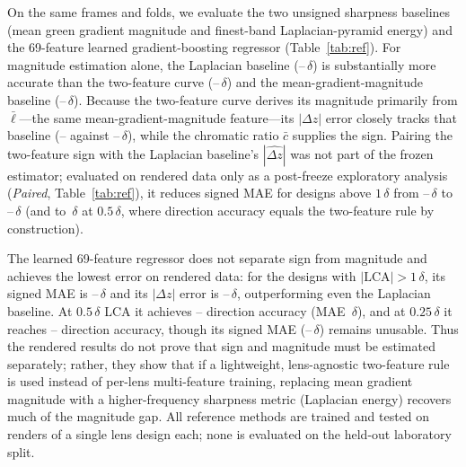 \documentclass{ieee-ojvt}
\begin{document}
On the same frames and folds, we evaluate the two unsigned sharpness baselines (mean green gradient magnitude and finest-band Laplacian-pyramid energy) and the 69-feature learned gradient-boosting regressor (Table~\ref{tab:ref}).
For magnitude estimation alone, the Laplacian baseline (\RefLapAbsMin--\RefLapAbsMax\,$\delta$) is substantially more accurate than the two-feature curve (\RefPhysAbsMin--\RefPhysAbsMax\,$\delta$) and the mean-gradient-magnitude baseline (\RefTenAbsMin--\RefTenAbsMax\,$\delta$).
Because the two-feature curve derives its magnitude primarily from $\bar\ell$---the same mean-gradient-magnitude feature---its $|\Delta z|$ error closely tracks that baseline (\RefPhysAbsMin--\RefPhysAbsMax{} against \RefTenAbsMin--\RefTenAbsMax\,$\delta$), while the chromatic ratio $\bar c$ supplies the sign. Pairing the two-feature sign with the Laplacian baseline's $|\widehat{\Delta z}|$ was not part of the frozen estimator; evaluated on rendered data only as a post-freeze exploratory analysis (\emph{Paired}, Table~\ref{tab:ref}), it reduces signed MAE for designs above $1\,\delta$ from \RefPhysMaeMin--\RefPhysMaeMax\,$\delta$ to \RefPairedMaeMin--\RefPairedMaeMax\,$\delta$ (and to \RefHalfPairedMae\,$\delta$ at $0.5\,\delta$, where direction accuracy equals the two-feature rule by construction).

The learned 69-feature regressor does not separate sign from magnitude and achieves the lowest error on rendered data: for the \RefGateBN{} designs with $|\mathrm{LCA}|>1\,\delta$, its signed MAE is \RefLearnMaeMin--\RefLearnMaeMax\,$\delta$ and its $|\Delta z|$ error is \RefLearnAbsMin--\RefLearnAbsMax\,$\delta$, outperforming even the Laplacian baseline. At $0.5\,\delta$ LCA it achieves \RefHalfLearnDirMin--\RefHalfLearnDirMax{} direction accuracy (MAE \RefHalfLearnMae\,$\delta$), and at $0.25\,\delta$ it reaches \RefQuarterLearnDirMin--\RefQuarterLearnDirMax{} direction accuracy, though its signed MAE (\RefQuarterLearnMaeMin--\RefQuarterLearnMaeMax\,$\delta$) remains unusable. Thus the rendered results do not prove that sign and magnitude must be estimated separately; rather, they show that if a lightweight, lens-agnostic two-feature rule is used instead of per-lens multi-feature training, replacing mean gradient magnitude with a higher-frequency sharpness metric (Laplacian energy) recovers much of the magnitude gap. All reference methods are trained and tested on renders of a single lens design each; none is evaluated on the held-out laboratory split.

\end{document}
